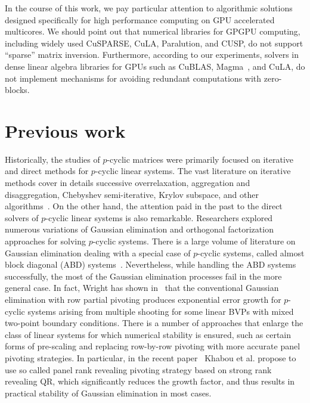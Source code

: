 \documentclass{llncs}
\newcommand{\Blas}{{\sc BLAS}\xspace}
\newcommand{\CuBlas}{{\sc Cu\Blas}\xspace}
\newcommand{\CuSparse}{{\sc CuSPARSE}\xspace}
\newcommand{\Magma}{{\sc Magma}\xspace}
\newcommand{\Cula}{{\sc CuLA}\xspace}
\newcommand{\Paralution}{{\sc Paralution}\xspace}
\newcommand{\Cusp}{{\sc CUSP}\xspace}
\begin{document}
In the course of this work, we pay particular attention to 
algorithmic solutions designed specifically for high performance computing 
on GPU accelerated multicores.
We should point out that numerical libraries for GPGPU computing,
including widely used 
\CuSparse, %
\Cula, %
\Paralution, %
and \Cusp, %
do not support ``sparse'' matrix inversion.
Furthermore, according to our experiments, 
solvers in dense linear algebra libraries for GPUs 
such as \CuBlas, %
\Magma~\cite{Tomov10Magma}, %
and \Cula, %
do not implement mechanisms for avoiding redundant 
computations with zero-blocks.

\section{Previous work} 
\label{sec:background}

Historically, the studies of $p$-cyclic matrices
were primarily focused on iterative and direct methods for $p$-cyclic linear
systems. The vast literature on iterative methods cover in details
successive overrelaxation,
aggregation and disaggregation,
Chebyshev semi-iterative, 
Krylov subspace, 
and other algorithms~\cite{Ernst00}.
On the other hand, the attention paid in the past to the direct solvers 
of $p$-cyclic linear systems is also remarkable.
Researchers explored numerous variations of Gaussian elimination and 
orthogonal factorization approaches for solving $p$-cyclic systems.
There is a large volume of literature on Gaussian elimination
dealing with a special case of $p$-cyclic systems, 
called almost block diagonal (ABD) systems~\cite{Wright92BSOF}.
Nevertheless, while 
handling %
the ABD systems successfully, 
the most of the Gaussian elimination processes fail in the more general case.
In fact, Wright has shown in~\cite{Wright93} that 
the conventional Gaussian elimination with row partial pivoting %
produces exponential error growth
for $p$-cyclic systems arising from multiple shooting for 
some linear BVPs with mixed two-point boundary conditions. 
There is a number of approaches that enlarge the class of linear systems
for which numerical stability is ensured, 
such as certain forms of pre-scaling
and replacing row-by-row pivoting with 
more accurate panel pivoting strategies.
In particular, 
in the recent paper~\cite{KhabouDGG13} Khabou et al.
propose to use so called panel rank revealing pivoting strategy 
based on strong rank revealing QR, 
which significantly reduces the growth factor, and 
thus results in practical stability of Gaussian elimination in most cases.
\end{document}
